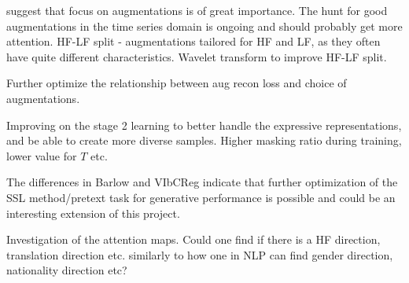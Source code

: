 \documentclass[../../thesis.tex]{subfiles}
\begin{document}
\cite{morningstar2024augmentations} suggest that focus on augmentations is of great importance. The hunt for good augmentations in the time series domain is ongoing and should probably get more attention.\newline
HF-LF split - augmentations tailored for HF and LF, as they often have quite different characteristics.\newline
Wavelet transform to improve HF-LF split.\newline

Further optimize the relationship between aug recon loss and choice of augmentations.\newline

Improving on the stage 2 learning to better handle the expressive representations, and be able to create more diverse samples. Higher masking ratio during training, lower value for $T$ etc.\newline

The differences in Barlow and VIbCReg indicate that further optimization of the SSL method/pretext task for generative performance is possible and could be an interesting extension of this project. \newline

Investigation of the attention maps. Could one find if there is a HF direction, translation direction etc. similarly to how one in NLP can find gender direction, nationality direction etc?
\end{document}
